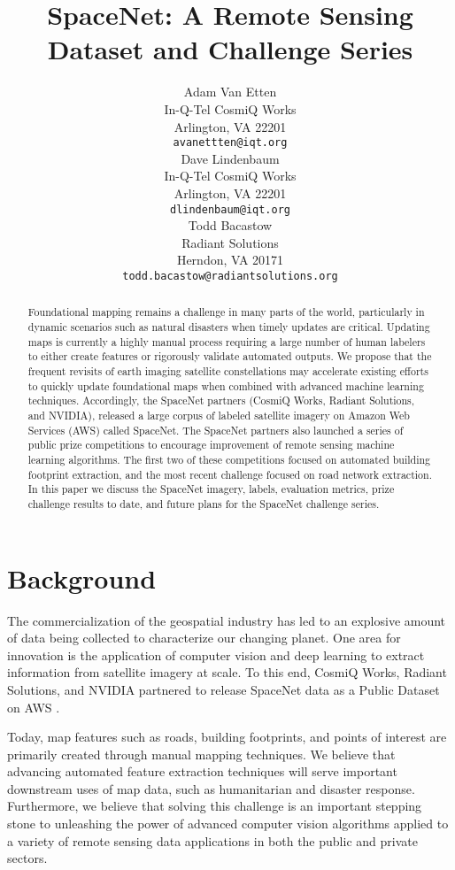 \documentclass{article}
\title{SpaceNet: A Remote Sensing Dataset and Challenge Series}
\author{
  Adam Van Etten \\
  In-Q-Tel CosmiQ Works\\
Arlington, VA 22201 \\
  \texttt{avanettten@iqt.org} \\
  \And  
  Dave Lindenbaum \\
  In-Q-Tel CosmiQ Works \\
  Arlington, VA 22201 \\
  \texttt{dlindenbaum@iqt.org} \\
  \And 
  Todd Bacastow \\
  Radiant Solutions \\
  Herndon, VA 20171 \\
  \texttt{todd.bacastow@radiantsolutions.org}
}
\begin{document}
\maketitle

\begin{abstract}
Foundational mapping remains a challenge in many parts of the world, particularly in dynamic scenarios such as natural disasters when timely updates are critical.  Updating maps is currently a highly manual process requiring a large number of human labelers to either create features or rigorously validate automated outputs.  We propose that the frequent revisits of earth imaging satellite constellations may accelerate existing efforts to quickly update foundational maps when combined with advanced machine learning techniques.  Accordingly, the SpaceNet partners (CosmiQ Works, Radiant Solutions, and NVIDIA), released a large corpus of labeled satellite imagery on Amazon Web Services (AWS) called SpaceNet.  The SpaceNet partners also launched a series of public prize competitions to encourage improvement of remote sensing machine learning algorithms.  The first two of these competitions focused on automated building footprint extraction, and the most recent challenge focused on road network extraction.  In this paper we discuss the SpaceNet imagery, labels, evaluation metrics, prize challenge results to date, and future plans for the SpaceNet challenge series.  
\end{abstract}

\section{Background}

The commercialization of the geospatial industry has led to an explosive amount of data being collected to characterize our changing planet. One area for innovation is the application of computer vision and deep learning to extract information from satellite imagery at scale. To this end, CosmiQ Works, Radiant Solutions, and NVIDIA partnered to release SpaceNet data as a Public Dataset on AWS \cite{sn_s3}.


Today, map features such as roads, building footprints, and points of interest are primarily created through manual mapping techniques. We believe that advancing automated feature extraction techniques will serve important downstream uses of map data, such as humanitarian and disaster response. Furthermore, we believe that solving this challenge is an important stepping stone to unleashing the power of advanced computer vision algorithms applied to a variety of remote sensing data applications in both the public and private sectors.
\end{document}
